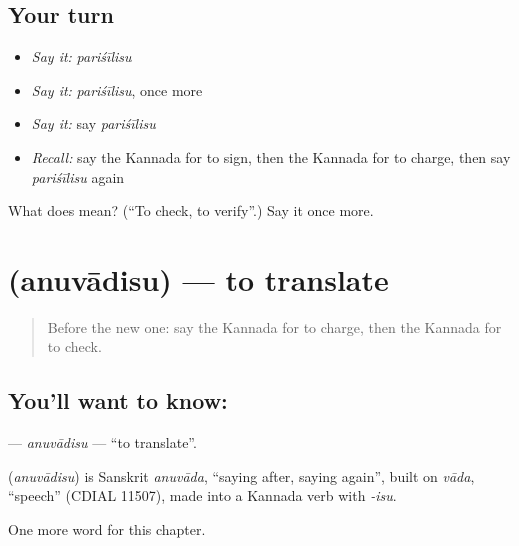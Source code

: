 \subsection*{Your turn}
\begin{itemize}
\raggedright
  \item \emph{Say it:} \emph{pariśīlisu}
  \item \emph{Say it:} \emph{pariśīlisu}, once more
  \item \emph{Say it:} say \emph{pariśīlisu}
  \item \emph{Recall:} say the Kannada for to sign, then the Kannada for to charge, then say \emph{pariśīlisu} again
\end{itemize}

\begin{tcolorbox}[breakable,colback=teal!4,colframe=teal!35!black,title={Before you move on}]
What does  mean? (\textquotedblleft{}To check, to verify\textquotedblright{}.) Say it once more.
\end{tcolorbox}
\section[\texorpdfstring{\kn{ಅನುವಾದಿಸು} (anuvādisu)}{ಅನುವಾದಿಸು (anuvādisu)}]{ (anuvādisu) — to translate}

\label{lesson:KA-C275-anuvadisu}



\begin{quote}
Before the new one: say the Kannada for to charge, then the Kannada for to check.
\end{quote}

\subsection*{You'll want to know: }
\textbf{} — \emph{anuvādisu} — \textquotedblleft{}to translate\textquotedblright{}.

\begin{cousinweb}
\textbf{} (\emph{anuvādisu}) is Sanskrit \emph{anuvāda}, \textquotedblleft{}saying after, saying again\textquotedblright{}, built on \emph{vāda}, \textquotedblleft{}speech\textquotedblright{} (CDIAL 11507), made into a Kannada verb with \emph{-isu}.
\end{cousinweb}

\begin{grammarlens}[title={What you've built}]
One more word for this chapter.
\end{grammarlens}

